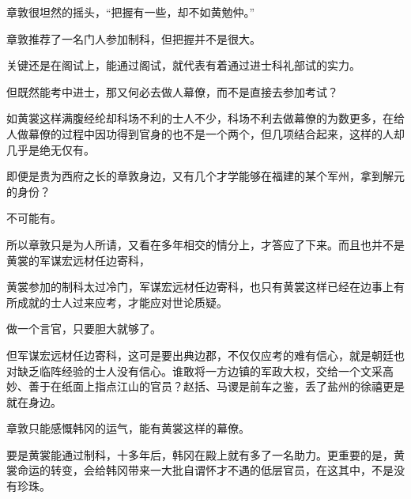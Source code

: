 章敦很坦然的摇头，“把握有一些，却不如黄勉仲。”

章敦推荐了一名门人参加制科，但把握并不是很大。

关键还是在阁试上，能通过阁试，就代表有着通过进士科礼部试的实力。

但既然能考中进士，那又何必去做人幕僚，而不是直接去参加考试？

如黄裳这样满腹经纶却科场不利的士人不少，科场不利去做幕僚的为数更多，在给人做幕僚的过程中因功得到官身的也不是一个两个，但几项结合起来，这样的人却几乎是绝无仅有。

即便是贵为西府之长的章敦身边，又有几个才学能够在福建的某个军州，拿到解元的身份？

不可能有。

所以章敦只是为人所请，又看在多年相交的情分上，才答应了下来。而且也并不是黄裳的军谋宏远材任边寄科，

黄裳参加的制科太过冷门，军谋宏远材任边寄科，也只有黄裳这样已经在边事上有所成就的士人过来应考，才能应对世论质疑。

做一个言官，只要胆大就够了。

但军谋宏远材任边寄科，这可是要出典边郡，不仅仅应考的难有信心，就是朝廷也对缺乏临阵经验的士人没有信心。谁敢将一方边镇的军政大权，交给一个文采高妙、善于在纸面上指点江山的官员？赵括、马谡是前车之鉴，丢了盐州的徐禧更是就在身边。

章敦只能感慨韩冈的运气，能有黄裳这样的幕僚。

要是黄裳能通过制科，十多年后，韩冈在殿上就有多了一名助力。更重要的是，黄裳命运的转变，会给韩冈带来一大批自谓怀才不遇的低层官员，在这其中，不是没有珍珠。
